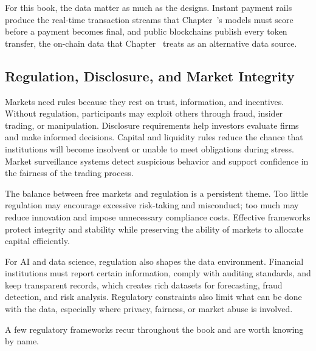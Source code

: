 \documentclass[../ai_in_finance]{subfiles}
\begin{document}
For this book, the data matter as much as the designs. Instant payment rails produce the real-time transaction streams that Chapter~'s models must score before a payment becomes final, and public blockchains publish every token transfer, the on-chain data that Chapter~ treats as an alternative data source.

\subsection{Regulation, Disclosure, and Market Integrity}

Markets need rules because they rest on trust, information, and incentives. Without regulation, participants may exploit others through fraud, insider trading, or manipulation. Disclosure requirements help investors evaluate firms and make informed decisions. Capital and liquidity rules reduce the chance that institutions will become insolvent or unable to meet obligations during stress. Market surveillance systems detect suspicious behavior and support confidence in the fairness of the trading process.

The balance between free markets and regulation is a persistent theme. Too little regulation may encourage excessive risk-taking and misconduct; too much may reduce innovation and impose unnecessary compliance costs. Effective frameworks protect integrity and stability while preserving the ability of markets to allocate capital efficiently.

For AI and data science, regulation also shapes the data environment. Financial institutions must report certain information, comply with auditing standards, and keep transparent records, which creates rich datasets for forecasting, fraud detection, and risk analysis. Regulatory constraints also limit what can be done with the data, especially where privacy, fairness, or market abuse is involved.

A few regulatory frameworks recur throughout the book and are worth knowing by name.
\end{document}
